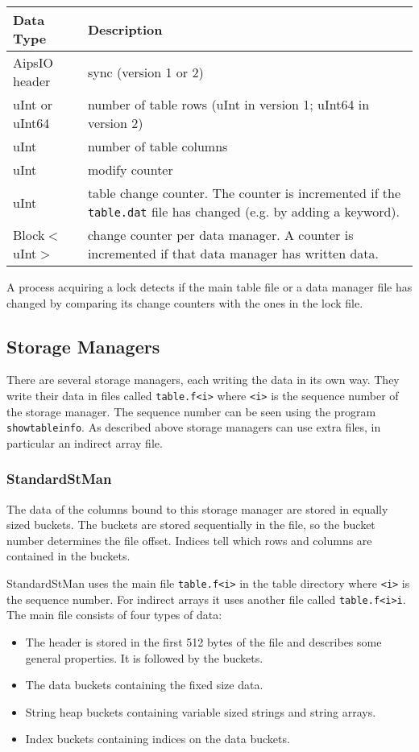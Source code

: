 \vspace{0.15in}
\begin{tabular}{|l|p{13cm}|} \hline
  Data Type & Description \\ \hline\hline
  AipsIO header & sync (version 1 or 2) \\
  uInt or uInt64& number of table rows (uInt in version 1; uInt64
                  in version 2)\\
  uInt & number of table columns \\
  uInt & modify counter \\
  uInt & table change counter. The counter is incremented if the
  \texttt{table.dat} file has changed (e.g. by adding a keyword). \\
  Block$<$uInt$>$ & change counter per data manager. A counter is
  incremented if that data manager has written data. \\
  \hline
\end{tabular}
\vspace{0.15in}

A process acquiring a lock detects if the main table file or a data
manager file has changed by comparing its change counters with the
ones in the lock file.

\subsection{Storage Managers}
There are several storage managers, each writing the data in its own
way. They write their data in files called \texttt{table.f<i>} where \texttt{<i>}
is the sequence number of the storage manager. The sequence number can
be seen using the program \texttt{showtableinfo}.
As described above storage managers can use extra files, in particular
an indirect array file.

\subsubsection{\label{CTDS:STANDARDSTMAN}StandardStMan}
The data of the columns bound to this storage manager are stored in
equally sized buckets. The buckets are stored sequentially in the
file, so the bucket number determines the file offset. Indices tell
which rows and columns are contained in the buckets.

StandardStMan uses the main file \texttt{table.f<i>} in the table
directory where \texttt{<i>} is the sequence number.
For indirect arrays it uses another file called
\texttt{table.f<i>i}.
The main file consists of four types of data:
\begin{itemize}
\item The header is stored in the first 512 bytes of the file and
  describes some general properties. It is
  followed by the buckets.
\item The data buckets containing the fixed size data.
\item String heap buckets containing variable sized strings and string
  arrays.
\item Index buckets containing indices on the data buckets.
\end{itemize}

